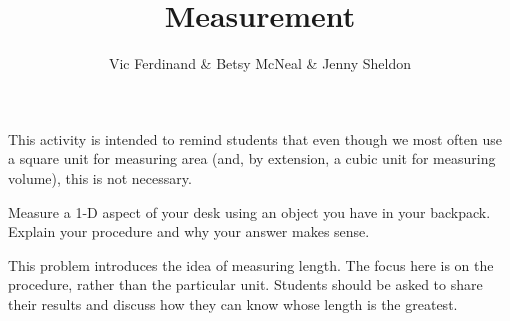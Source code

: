 \documentclass[handout]{ximera}
\title{Measurement}
\author{Vic Ferdinand \& Betsy McNeal \& Jenny Sheldon}
\begin{document}
\begin{abstract}
\end{abstract}
\maketitle

\begin{instructorIntro}
This activity is intended to remind students that even though we most often use a square unit for measuring area (and, by extension, a cubic unit for measuring volume), this is not necessary.


\end{instructorIntro}

\begin{problem}
Measure a 1-D aspect of your desk using an object you have in your backpack.  Explain your procedure and why your answer makes sense.  

\begin{instructorIntro}
This problem introduces the idea of measuring length.  The focus here is on the procedure, rather than the particular unit.  Students should be asked to share their results and discuss how they can know whose length is the greatest.
\end{instructorIntro}
\end{problem}



\end{document}
